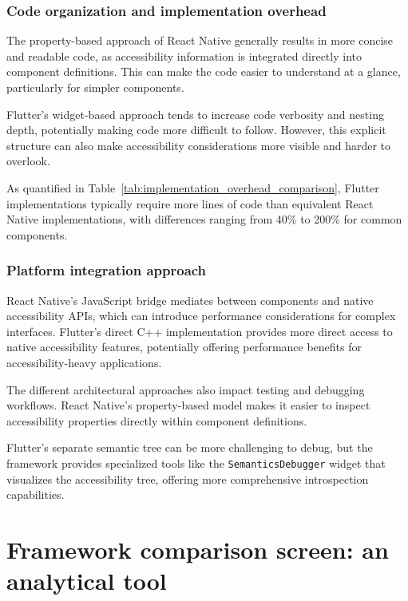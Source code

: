 \FloatBarrier

\subsubsection{Code organization and implementation overhead}

The property-based approach of React Native generally results in more concise and readable code, as accessibility information is integrated directly into component definitions. This can make the code easier to understand at a glance, particularly for simpler components.

Flutter's widget-based approach tends to increase code verbosity and nesting depth, potentially making code more difficult to follow. However, this explicit structure can also make accessibility considerations more visible and harder to overlook.

As quantified in Table~\ref{tab:implementation_overhead_comparison}, Flutter implementations typically require more lines of code than equivalent React Native implementations, with differences ranging from 40\% to 200\% for common components.

\subsubsection{Platform integration approach}

React Native's JavaScript bridge mediates between components and native accessibility APIs, which can introduce performance considerations for complex interfaces. Flutter's direct C++ implementation provides more direct access to native accessibility features, potentially offering performance benefits for accessibility-heavy applications.

The different architectural approaches also impact testing and debugging workflows. React Native's property-based model makes it easier to inspect accessibility properties directly within component definitions.

Flutter's separate semantic tree can be more challenging to debug, but the framework provides specialized tools like the \texttt{SemanticsDebugger} widget that visualizes the accessibility tree, offering more comprehensive introspection capabilities.

\section{Framework comparison screen: an analytical tool}
\label{sec:framework-comparison}

